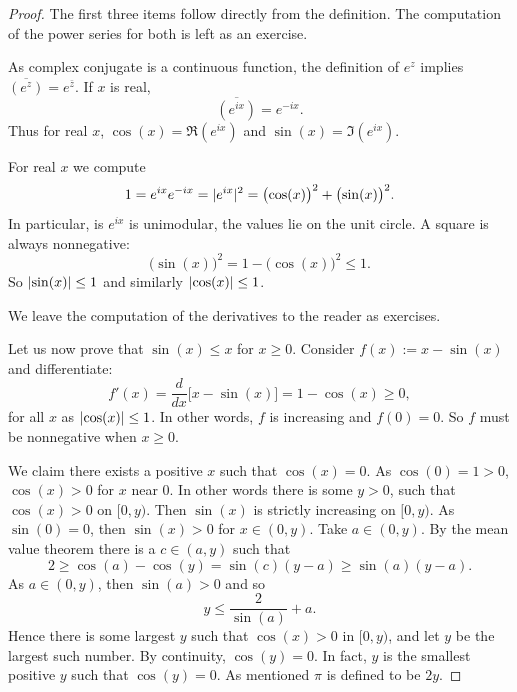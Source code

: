 \begin{proof}
The first three items follow directly from the definition.
The computation of the power series for both is left as an exercise.

As complex conjugate is a continuous function, the definition
of $e^z$ implies
$\overline{(e^z)} = e^{\bar{z}}$.  If
$x$ is real,
\begin{equation*}
\overline{(e^{ix})} = e^{-ix} .
\end{equation*}
Thus for real $x$,
$\cos(x) = \Re (e^{ix})$ and $\sin(x) = \Im (e^{ix})$.

For real $x$ we compute
\begin{equation*}
1 =  e^{ix} e^{-ix} = \lvert {e^{ix}} \rvert^2 = {\bigl( \cos(x) \bigr)}^2 + {\bigl( \sin(x) \bigr)}^2 .
\end{equation*}
In particular, is $e^{ix}$ is unimodular, the values lie on the unit circle.
A square is always nonnegative:
\begin{equation*}
{\bigl(\sin(x)\bigr)}^2 = 1-{\bigl(\cos(x)\bigr)}^2 \leq 1 .
\end{equation*}
So $\lvert {\sin(x)} \rvert \leq 1$ and similarly 
$\lvert {\cos(x)} \rvert \leq 1$.

We leave the computation of the derivatives to the reader as exercises.

Let us now prove that $\sin(x) \leq x$ for $x \geq 0$.
Consider
$f(x) := x-\sin(x)$ and differentiate:
\begin{equation*}
f'(x) = \frac{d}{dx} \bigl[ x - \sin(x) \bigr]
=
1 -\cos(x) \geq 0 ,
\end{equation*}
for all $x$ as $\lvert {\cos(x)} \rvert \leq 1$.
In other words, $f$ is increasing and $f(0) = 0$.
So $f$ must be nonnegative when $x \geq 0$.

We claim there exists a positive $x$ such that $\cos(x) = 0$.
As $\cos(0) = 1 > 0$, $\cos(x) > 0$
for $x$ near 0.  In other words
there is some
$y > 0$, such that $\cos(x) > 0$ on $[0,y)$.
Then $\sin(x)$ is strictly
increasing on $[0,y)$.  As $\sin(0) = 0$, then
$\sin(x) > 0$ for $x \in (0,y)$.  Take $a \in (0,y)$.  By
the mean value theorem there is a $c \in (a,y)$ such that
\begin{equation*}
2 \geq \cos(a)-\cos(y) = \sin(c)(y-a) \geq \sin(a)(y-a) .
\end{equation*}
As $a \in (0,y)$, then $\sin(a) > 0$ and so
\begin{equation*}
y \leq \frac{2}{\sin(a)} + a .
\end{equation*}
Hence there is some largest $y$ such that $\cos(x) > 0$ in $[0,y)$,
and let $y$ be the largest such number.
By continuity, $\cos(y) = 0$.
In fact, $y$ is the
smallest positive $y$ such that $\cos(y) = 0$.  As mentioned
$\pi$ is defined to be $2y$.


\end{proof}
